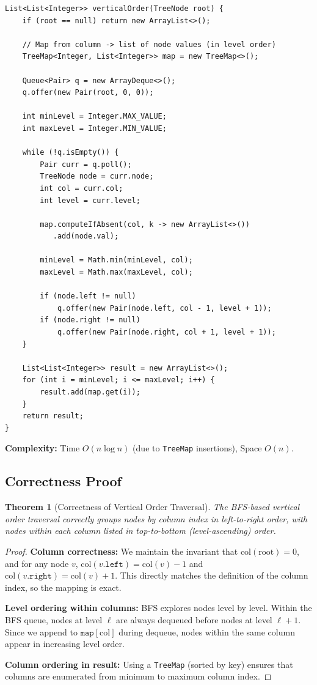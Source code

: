 \documentclass[10pt,journal,compsoc,onecolumn]{IEEEtran}
\newtheorem{theorem}{Theorem}
\begin{document}
\begin{verbatim}
List<List<Integer>> verticalOrder(TreeNode root) {
    if (root == null) return new ArrayList<>();

    // Map from column -> list of node values (in level order)
    TreeMap<Integer, List<Integer>> map = new TreeMap<>();

    Queue<Pair> q = new ArrayDeque<>();
    q.offer(new Pair(root, 0, 0));

    int minLevel = Integer.MAX_VALUE;
    int maxLevel = Integer.MIN_VALUE;

    while (!q.isEmpty()) {
        Pair curr = q.poll();
        TreeNode node = curr.node;
        int col = curr.col;
        int level = curr.level;

        map.computeIfAbsent(col, k -> new ArrayList<>())
           .add(node.val);

        minLevel = Math.min(minLevel, col);
        maxLevel = Math.max(maxLevel, col);

        if (node.left != null)
            q.offer(new Pair(node.left, col - 1, level + 1));
        if (node.right != null)
            q.offer(new Pair(node.right, col + 1, level + 1));
    }

    List<List<Integer>> result = new ArrayList<>();
    for (int i = minLevel; i <= maxLevel; i++) {
        result.add(map.get(i));
    }
    return result;
}
\end{verbatim}

\textbf{Complexity:} Time $O(n \log n)$ (due to \texttt{TreeMap} insertions), Space $O(n)$.

\subsection{Correctness Proof}

\begin{theorem}[Correctness of Vertical Order Traversal]
The BFS-based vertical order traversal correctly groups nodes by column index in left-to-right order, with nodes within each column listed in top-to-bottom (level-ascending) order.
\end{theorem}

\begin{proof}
\textbf{Column correctness:} We maintain the invariant that $\text{col}(\text{root}) = 0$, and for any node $v$, $\text{col}(v.\texttt{left}) = \text{col}(v) - 1$ and $\text{col}(v.\texttt{right}) = \text{col}(v) + 1$. This directly matches the definition of the column index, so the mapping is exact.

\textbf{Level ordering within columns:} BFS explores nodes level by level. Within the BFS queue, nodes at level $\ell$ are always dequeued before nodes at level $\ell + 1$. Since we append to $\texttt{map}[\text{col}]$ during dequeue, nodes within the same column appear in increasing level order. \checkmark

\textbf{Column ordering in result:} Using a \texttt{TreeMap} (sorted by key) ensures that columns are enumerated from minimum to maximum column index. \checkmark
\end{proof}
\end{document}
